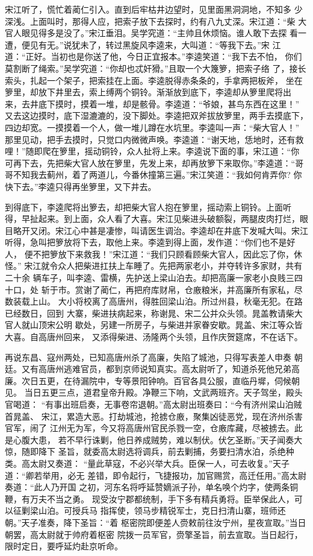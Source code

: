 宋江听了，慌忙着蔺仁引入。直到后牢枯井边望时，见里面黑洞洞地，不知多
少深浅。上面叫时，那得人应，把索子放下去探时，约有八九丈深。宋江道：“柴
大官人眼见得多是没了。”宋江垂泪。吴学究道：“主帅且休烦恼。谁人敢下去探
看一遭，便见有无。”说犹未了，转过黑旋风李逵来，大叫道：“等我下去。”宋
江道：“正好。当初也是你送了他，今日正宜报本。”李逵笑道：“我下去不怕，
你们莫割断了绳索。”吴学究道：“你却也忒奸猾。”且取一个大篾箩，把索子络
了，接长索头，扎起一个架子，把索挂在上面。李逵脱得赤条条的，手拿两把板斧，
坐在箩里，却放下井里去，索上缚两个铜铃。渐渐放到底下，李逵却从箩里爬将出
来，去井底下摸时，摸着一堆，却是骸骨。李逵道：“爷娘，甚鸟东西在这里！”
又去这边摸时，底下湿漉漉的，没下脚处。李逵把双斧拔放箩里，两手去摸底下，
四边却宽。一摸摸着一个人，做一堆儿蹲在水坑里。李逵叫一声：“柴大官人！”
那里见动，把手去摸时，只觉口内微微声唤。李逵道：“谢天地，恁地时，还有救
哩！”随即爬在箩里，摇动铜铃，众人扯将上来。李逵说下面的事，宋江道：“你
可再下去，先把柴大官人放在箩里，先发上来，却再放箩下来取你。”李逵道：“哥
哥不知我去蓟州，着了两道儿，今番休撞第三遍。”宋江笑道：“我如何肯弄你?
你快下去。”李逵只得再坐箩里，又下井去。

到得底下，李逵爬将出箩去，却把柴大官人抱在箩里，摇动索上铜铃。上面听
得，早扯起来。到上面，众人看了大喜。宋江见柴进头破额裂，两腿皮肉打烂，眼
目略开又闭。宋江心中甚是凄惨，叫请医生调治。李逵却在井底下发喊大叫。宋江
听得，急叫把箩放将下去，取他上来。李逵到得上面，发作道：“你们也不是好人，
便不把箩放下来救我！”宋江道：“我们只顾看顾柴大官人，因此忘了你，休怪。”
宋江就令众人把柴进扛扶上车睡了。先把两家老小，并夺转许多家财，共有二十余
辆车子，叫李逵、雷横，先护送上梁山泊去。却把高廉一家老小良贱三四十口，处
斩于市。赏谢了蔺仁，再把府库财帛，仓廒粮米，并高廉所有家私，尽数装载上山。
大小将校离了高唐州，得胜回梁山泊。所过州县，秋毫无犯。在路已经数日，回到
大寨，柴进扶病起来，称谢晁、宋二公并众头领。晁盖教请柴大官人就山顶宋公明
歇处，另建一所房子，与柴进并家眷安歇。晁盖、宋江等众皆大喜。自高唐州回来，
又添得柴进、汤隆两个头领，且作庆贺筵席，不在话下。

再说东昌、寇州两处，已知高唐州杀了高廉，失陷了城池，只得写表差人申奏
朝廷。又有高唐州逃难官员，都到京师说知真实。高太尉听了，知道杀死他兄弟高
廉。次日五更，在待漏院中，专等景阳钟响。百官各具公服，直临丹墀，伺候朝见。
当日五更三点，道君皇帝升殿。净鞭三下响，文武两班齐。天子驾坐，殿头官喝道：
“有事出班启奏，无事卷帘退朝。”高太尉出班奏曰：“今有济州梁山泊贼首晁盖、
宋江，累造大恶。打劫城池，抢掳仓廒，聚集凶徒恶党，现在济州杀害官军，闹了
江州无为军，今又将高唐州官民杀戮一空，仓廒库藏，尽被掳去。此是心腹大患，
若不早行诛剿，他日养成贼势，难以制伏。伏乞圣断。”天子闻奏大惊，随即降下
圣旨，就委高太尉选将调兵，前去剿捕，务要扫清水泊，杀绝种类。高太尉又奏道：
“量此草寇，不必兴举大兵。臣保一人，可去收复。”天子道：“卿若举用，必无
差错，即令起行，飞捷报功，加官赐赏，高迁任用。”高太尉奏道：“此人乃开国
之初，河东名将呼延赞嫡派子孙，单名唤个灼字，使两条铜鞭，有万夫不当之勇。
现受汝宁郡都统制，手下多有精兵勇将。臣举保此人，可以征剿梁山泊。可授兵马
指挥使，领马步精锐军士，克日扫清山寨，班师还朝。”天子准奏，降下圣旨：“着
枢密院即便差人赍敕前往汝宁州，星夜宣取。”当日朝罢，高太尉就于帅府着枢密
院拨一员军官，赍擎圣旨，前去宣取。当日起行，限时定日，要呼延灼赴京听命。

